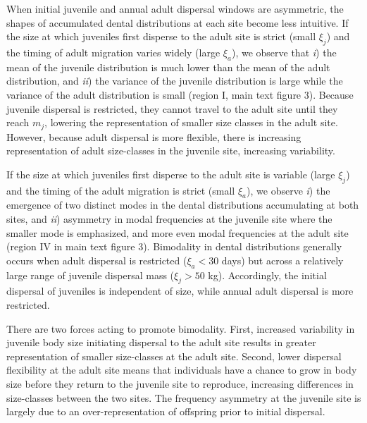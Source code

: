 \documentclass[]{rsos}%
\begin{document}
When initial juvenile and annual adult dispersal windows are asymmetric, the shapes of accumulated dental distributions at each site become less intuitive.
If the size at which juveniles first disperse to the adult site is strict (small $\xi_j$) and the timing of adult migration varies widely (large $\xi_a$), we observe that \emph{i}) the mean of the juvenile distribution is much lower than the mean of the adult distribution, and \emph{ii}) the variance of the juvenile distribution is large while the variance of the adult distribution is small (region I, main text figure 3).
Because juvenile dispersal is restricted, they cannot travel to the adult site until they reach $m_j$, lowering the representation of smaller size classes in the adult site. 
However, because adult dispersal is more flexible, there is increasing representation of adult size-classes in the juvenile site, increasing variability.

If the size at which juveniles first disperse to the adult site is variable (large $\xi_j$) and the timing of the adult migration is strict (small $\xi_a$), we observe \emph{i}) the emergence of two distinct modes in the dental distributions accumulating at both sites, and \emph{ii}) asymmetry in modal frequencies at the juvenile site where the smaller mode is emphasized, and more even modal frequencies at the adult site (region IV in main text figure 3).
Bimodality in dental distributions generally occurs when adult dispersal is restricted ($\xi_a < 30$ days) but across a relatively large range of juvenile dispersal mass ($\xi_j > 50$ kg).
Accordingly, the initial dispersal of juveniles is independent of size, while annual adult dispersal is more restricted.

There are two forces acting to promote bimodality.
First, increased variability in juvenile body size initiating dispersal to the adult site results in greater representation of smaller size-classes at the adult site.
Second, lower dispersal flexibility at the adult site means that individuals have a chance to grow in body size before they return to the juvenile site to reproduce, increasing differences in size-classes between the two sites.
The frequency asymmetry at the juvenile site is largely due to an over-representation of offspring prior to initial dispersal.
\end{document}
